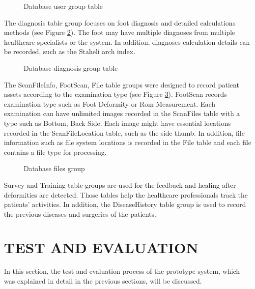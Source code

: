 \begin{figure}[htbp]
\centering
{}
\caption{Database user group table}
\label{fig:DatabaseUser}
\end{figure}

The diagnosis table group focuses on foot diagnosis and detailed calculations methods (see Figure \ref{fig:DatabaseDiagnosis}). The foot may have multiple diagnoses from multiple healthcare specialists or the system. In addition, diagnoses calculation details can be recorded, such as the Staheli arch index.

\begin{figure}[htbp]
\centering
{}
\caption{Database diagnosis group table}
\label{fig:DatabaseDiagnosis}
\end{figure}

The ScanFileInfo, FootScan, File table groups were designed to record patient assets according to the examination type (see Figure \ref{fig:DatabaseFiles}). FootScan records examination type such as Foot Deformity or Rom Measurement. Each examination can have unlimited images recorded in the ScanFiles table with a type such as Bottom, Back Side. Each image might have essential locations recorded in the ScanFileLocation table, such as the side thumb. In addition, file information such as file system locations is recorded in the File table and each file contains a file type for processing.

\begin{figure}[htbp]
\centering
{}
\caption{Database files group}
\label{fig:DatabaseFiles}
\end{figure}

Survey and Training table groups are used for the feedback and healing after deformities are detected. Those tables help the healthcare professionals track the patients' activities. In addition, the DiseaseHistory table group is used to record the previous diseases and surgeries of the patients.

\section{TEST AND EVALUATION} \label{sec:StudyITestAndEvaluation}

In this section, the test and evaluation process of the prototype system, which was explained in detail in the previous sections, will be discussed.

